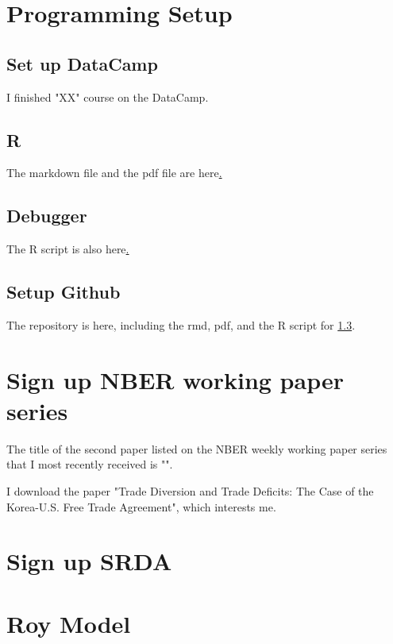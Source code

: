 \documentclass[12pt]{article}
\begin{document}
\section{Programming Setup}

\subsection{Set up DataCamp}
I finished "XX" course on the DataCamp.

\subsection{R}
The markdown file and the pdf file are here\href{https://github.com/JayChang426/ECON-7069.git}.\label{web}

\subsection{Debugger} \label{1.3}
The R script is also here\href{https://github.com/JayChang426/ECON-7069.git}.\label{web}

\subsection{Setup Github}
The repository is here\href{https://github.com/JayChang426/ECON-7069.git}, \label{web}
including the rmd, pdf, and the R script for \ref{1.3}.

\section{Sign up NBER working paper series}
The title of the second paper listed on the NBER weekly working paper series that I most recently received is "".

I download the paper "Trade Diversion and Trade Deficits: The Case of the Korea-U.S. Free Trade Agreement", which interests me.

\section{Sign up SRDA}


\section{Roy Model}
\end{document}
